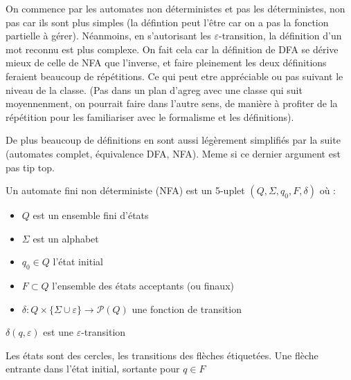\begin{com}
	On commence par les automates non déterministes et pas les déterministes, non pas car ils sont plus simples (la défintion peut l'être car on a pas la fonction partielle à gérer). Néanmoins, en s'autorisant les $\varepsilon$-transition, la définition d'un mot reconnu est plus complexe. On fait cela car la définition de DFA se dérive mieux de celle de NFA que l'inverse, et faire pleinement les deux définitions feraient beaucoup de répétitions. Ce qui peut etre appréciable ou pas suivant le niveau de la classe. (Pas dans un plan d'agreg avec une classe qui suit moyennenment, on pourrait faire dans l'autre sens, de manière à profiter de la répétition pour les familiariser avec le formalisme et les définitions).
	
	De plus beaucoup de définitions en sont aussi légèrement simplifiés par la suite (automates complet, équivalence DFA, NFA). Meme si ce dernier argument est pas tip top.
\end{com}

\begin{definition}
	Un automate fini non déterministe (NFA) est un 5-uplet $(Q, \Sigma, q_0, F, \delta)$ où : \begin{itemize}
		\item $Q$ est un ensemble fini d'états
		\item $\Sigma$ est un alphabet
		\item $q_0 \in Q$ l'état initial
		\item $F \subset Q$ l'ensemble des états acceptants (ou finaux)
		\item $\delta : Q × \{\Sigma \cup \varepsilon\} \to \mathcal P(Q)$ une fonction de transition
	\end{itemize}
\end{definition}

\begin{rem}
	$\delta(q, \varepsilon)$ est une $\varepsilon$-transition
\end{rem}

\begin{personalise}[Représentation]
	Les états sont des cercles, les transitions des flèches étiquetées. Une flèche entrante dans l'état initial, sortante pour $q\in F$
\end{personalise}

\begin{example}
	\label{29-eg}
\end{example}

